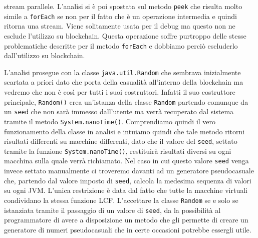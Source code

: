 stream parallele. L'analisi si è poi spostata sul metodo \lstinline|peek| che risulta molto simile a \lstinline|forEach| se non per il fatto che è un operazione intermedia e quindi ritorna una stream. Viene solitamente usata per il debug ma questo non ne esclude l'utilizzo su blockchain. Questa operazione soffre purtroppo delle stesse problematiche descritte per il metodo \lstinline|forEach| e dobbiamo perciò escluderlo dall'utilizzo su blockchain.

L'analisi prosegue con la classe \lstinline|java.util.Random| che sembrava inizialmente scartata a priori dato che porta della casualità all'interno della blockchain ma vedremo che non è così per tutti i suoi costruttori. Infatti il suo costruttore principale, \lstinline|Random()| crea un'istanza della classe \lstinline|Random| partendo comunque da un \lstinline|seed| che non sarà immesso dall'utente ma verrà recuperato dal sistema tramite il metodo \lstinline|System.nanoTime()|. Comprendiamo quindi il vero funzionamento della classe in analisi e intuiamo quindi che tale metodo ritorni risultati differenti su macchine differenti, dato che il valore del \lstinline|seed|, settato tramite la funzione \lstinline|System.nanoTime()|, restituirà risultati diversi su ogni macchina sulla quale verrà richiamato. Nel caso in cui questo valore \lstinline|seed| venga invece settato manualmente ci troveremo davanti ad un generatore pseudocasuale che, partendo dal valore imposto di \lstinline|seed|, calcola la medesima sequenza di valori su ogni JVM. L'unica restrizione è data dal fatto che tutte la macchine virtuali condividano la stessa funzione LCF. L'accettare la classe \lstinline|Random| se e solo se istanziata tramite il passaggio di un valore di \lstinline|seed|, da la possibilità al programmatore di avere a disposizione un metodo che gli permette di creare un generatore di numeri pseudocasuali che in certe occasioni potrebbe essergli utile.

